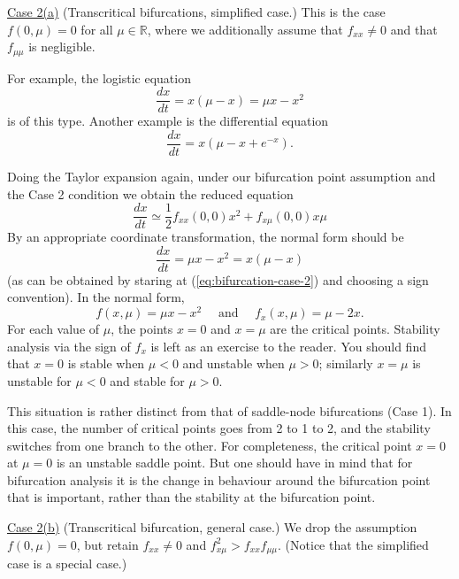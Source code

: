 \documentclass[11pt, letterpaper, oneside]{article}     %
\numberwithin{equation}{subsection}
\theoremstyle{definition}
\numberwithin{theorem}{section}
\theoremstyle{remark}
\newcommand{\RR}{\mathbb{R}}
\begin{document}
\begin{enumerate}
  \medskip

  \underline{Case 2(a)} (Transcritical bifurcations, simplified case.) This is the case $f(0,\mu) = 0$ for all $\mu \in \RR$, where we additionally assume that $f_{xx} \neq 0$ and that $f_{\mu\mu}$ is negligible.

  For example, the logistic equation
  \begin{equation}
    \frac{dx}{dt} = x(\mu - x) = \mu x - x^2
  \end{equation}
  is of this type. Another example is the differential equation
  \begin{equation}
    \frac{dx}{dt} = x(\mu - x + e^{-x}).
  \end{equation}

  Doing the Taylor expansion again, under our bifurcation point assumption and the Case 2 condition we obtain the reduced equation
  \begin{equation}\label{eq:bifurcation-case-2}
    \frac{dx}{dt} \simeq \frac{1}{2}f_{xx}(0,0)x^2 + f_{x\mu}(0,0)x\mu
  \end{equation}
  By an appropriate coordinate transformation, the normal form should be
  \begin{equation}
    \frac{dx}{dt} = \mu x - x^2 = x(\mu - x)
  \end{equation}
  (as can be obtained by staring at (\ref{eq:bifurcation-case-2}) and choosing a sign convention). In the normal form,
  \begin{equation}
    f(x,\mu) = \mu x - x^2\quad\text{ and }\quad f_x(x,\mu) = \mu - 2x.
  \end{equation}
  For each value of $\mu$, the points $x = 0$ and $x = \mu$ are the critical points. Stability analysis via the sign of $f_x$ is left as an exercise to the reader. You should find that $x = 0$ is stable when $\mu < 0$ and unstable when $\mu > 0$; similarly $x = \mu$ is unstable for $\mu < 0$ and stable for $\mu > 0$.

  This situation is rather distinct from that of saddle-node bifurcations (Case 1). In this case, the number of critical points goes from 2 to 1 to 2, and the stability switches from one branch to the other. For completeness, the critical point $x = 0$ at $\mu = 0$ is an unstable saddle point. But one should have in mind that for bifurcation analysis it is the change in behaviour around the bifurcation point that is important, rather than the stability at the bifurcation point.

  \underline{Case 2(b)} (Transcritical bifurcation, general case.) We drop the assumption $f(0,\mu) = 0$, but retain $f_{xx} \neq 0$ and $f_{x\mu}^2 > f_{xx}f_{\mu\mu}$. (Notice that the simplified case is a special case.)


\end{enumerate}
\end{document}
